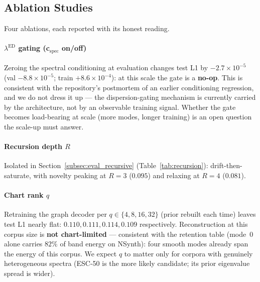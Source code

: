 \documentclass[12pt,a4paper]{article}
\begin{document}
\subsection{Ablation Studies}
\label{subsec:eval_ablation}

Four ablations, each reported with its honest reading.

\paragraph{$\lambda^{\mathrm{ED}}$ gating (c$_{\mathrm{spec}}$ on/off)}
Zeroing the spectral conditioning at evaluation changes test L1 by
$-2.7\times10^{-5}$ (val $-8.8\times10^{-5}$; train $+8.6\times10^{-4}$):
at this scale the gate is a \textbf{no-op}. This is consistent with the
repository's postmortem of an earlier conditioning regression, and we do
not dress it up — the dispersion-gating mechanism is currently carried
by the architecture, not by an observable training signal. Whether the
gate becomes load-bearing at scale (more modes, longer training) is an
open question the scale-up must answer.

\paragraph{Recursion depth $R$}
Isolated in Section~\ref{subsec:eval_recursive}
(Table~\ref{tab:recursion}): drift-then-saturate, with novelty peaking
at $R{=}3$ ($0.095$) and relaxing at $R{=}4$ ($0.081$).

\paragraph{Chart rank $q$}
Retraining the graph decoder per $q \in \{4, 8, 16, 32\}$ (prior rebuilt
each time) leaves test L1 nearly flat: $0.110, 0.111, 0.114, 0.109$
respectively. Reconstruction at this corpus size is \textbf{not
chart-limited} — consistent with the retention table (mode~0 alone
carries $82\%$ of band energy on NSynth): four smooth modes already
span the energy of this corpus. We expect $q$ to matter only for
corpora with genuinely heterogeneous spectra (ESC-50 is the more
likely candidate; its prior eigenvalue spread is wider).
\end{document}
